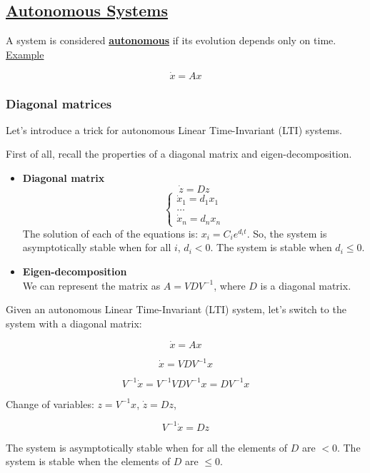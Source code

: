 \subsection*{\underline{Autonomous Systems}}

A system is considered \underline{\textbf{autonomous}} if its evolution depends only on time.\\

\underline{Example}

\[
\dot{x} = Ax
\]

\subsubsection{Diagonal matrices}

Let's introduce a trick for autonomous Linear Time-Invariant (LTI) systems.

First of all, recall the properties of a diagonal matrix and eigen-decomposition.
\begin{itemize}
    \item \textbf{Diagonal matrix}
        \[\dot{z} = Dz\]
        \[
        \begin{cases}
            \dot{x}_1 = d_1 x_1 \\
            \dots \\
            \dot{x}_n = d_n x_n
        \end{cases}
        \]
        The solution of each of the equations is: \(x_i = C_i e^{d_i t}\).
        So, the system is asymptotically stable when for all \(i\), \(d_i < 0\). 
        The system is stable when \(d_i \leq 0\).
    \item \textbf{Eigen-decomposition}\\
        We can represent the matrix as \(A = VDV^{-1}\), where \(D\) is a diagonal matrix.
\end{itemize}

Given an autonomous Linear Time-Invariant (LTI) system, let's switch to the system with a diagonal matrix:

\[
\dot{x} = Ax
\]

\[
\dot{x} = VDV^{-1}x
\]

\[
V^{-1}\dot{x} = V^{-1}VDV^{-1}x = DV^{-1}x
\]

Change of variables: \(z = V^{-1}x\), \(\dot{z} = Dz\), 

\[
V^{-1}\dot{x} = Dz
\]

The system is asymptotically stable when for all the elements of \(D\) are \( < 0\). 
The system is stable when the elements of \(D\) are \(\leq 0\).  

